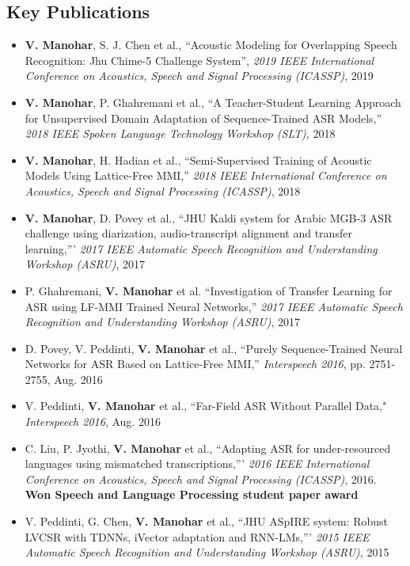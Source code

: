 \documentclass[margin,line,pifont,palatino,courier]{res}
\begin{document}
\begin{resume}
\section{\sc Key Publications}
\begin{itemize}
  \item
  \textbf{V. Manohar}, S. J. Chen et al., ``Acoustic Modeling for Overlapping Speech Recognition: Jhu Chime-5 Challenge System'', \textit{2019 IEEE International Conference on Acoustics, Speech and Signal Processing (ICASSP)}, 2019
  \item
  \textbf{V. Manohar}, P. Ghahremani et al., ``A Teacher-Student Learning Approach for Unsupervised Domain Adaptation of Sequence-Trained ASR Models,''  \textit{2018 IEEE Spoken Language Technology Workshop (SLT)}, 2018
  \item
  \textbf{V. Manohar}, H. Hadian et al., ``Semi-Supervised Training of Acoustic Models Using Lattice-Free MMI,'' \textit{2018 IEEE International Conference on Acoustics, Speech and Signal Processing (ICASSP)}, 2018
  \item
    \textbf{V. Manohar}, D. Povey et al., ``JHU Kaldi system for Arabic MGB-3 ASR challenge using diarization, audio-transcript alignment and transfer learning,''' \textit{2017 IEEE Automatic Speech Recognition and Understanding Workshop (ASRU)}, 2017
  \item
  P. Ghahremani, \textbf{V. Manohar} et al. ``Investigation of Transfer Learning for ASR using LF-MMI Trained Neural Networks,'' \textit{2017 IEEE Automatic Speech Recognition and Understanding Workshop (ASRU)}, 2017
  \item
    D. Povey, V. Peddinti, \textbf{V. Manohar} et al., ``Purely Sequence-Trained Neural Networks for ASR Based on Lattice-Free MMI,''  \textit{Interspeech 2016}, pp. 2751-2755, Aug. 2016
  \item
    V. Peddinti, \textbf{V. Manohar} et al., ``Far-Field ASR Without Parallel Data,"
    \textit{Interspeech 2016}, Aug. 2016
  \item
    C. Liu, P. Jyothi, \textbf{V. Manohar} et al.,
    ``Adapting ASR for under-resourced languages using mismatched
    transcriptions,'''
    \textit{2016 IEEE International Conference on Acoustics, Speech and Signal Processing (ICASSP)}, 2016. 
    \textbf{Won Speech and Language Processing student paper award}
  \item
    V. Peddinti, G. Chen, \textbf{V. Manohar} et al.,
    ``JHU ASpIRE system: Robust LVCSR with TDNNs, iVector adaptation and
    RNN-LMs,'''
    \textit{2015 IEEE Automatic Speech Recognition and Understanding Workshop (ASRU)}, 2015

\end{itemize}
\end{resume}
\end{document}
